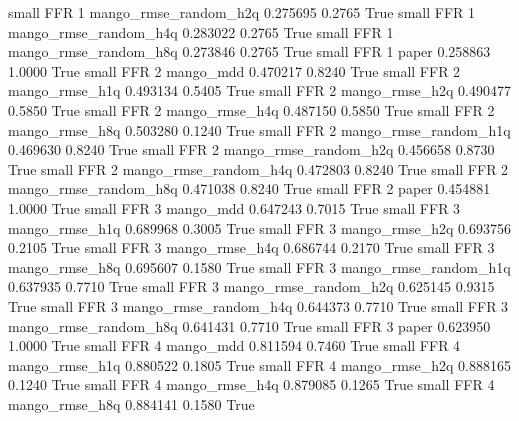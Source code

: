      small      FFR                 1 mango_rmse_random_h2q   0.275695      0.2765    True
     small      FFR                 1 mango_rmse_random_h4q   0.283022      0.2765    True
     small      FFR                 1 mango_rmse_random_h8q   0.273846      0.2765    True
     small      FFR                 1                 paper   0.258863      1.0000    True
     small      FFR                 2             mango_mdd   0.470217      0.8240    True
     small      FFR                 2        mango_rmse_h1q   0.493134      0.5405    True
     small      FFR                 2        mango_rmse_h2q   0.490477      0.5850    True
     small      FFR                 2        mango_rmse_h4q   0.487150      0.5850    True
     small      FFR                 2        mango_rmse_h8q   0.503280      0.1240    True
     small      FFR                 2 mango_rmse_random_h1q   0.469630      0.8240    True
     small      FFR                 2 mango_rmse_random_h2q   0.456658      0.8730    True
     small      FFR                 2 mango_rmse_random_h4q   0.472803      0.8240    True
     small      FFR                 2 mango_rmse_random_h8q   0.471038      0.8240    True
     small      FFR                 2                 paper   0.454881      1.0000    True
     small      FFR                 3             mango_mdd   0.647243      0.7015    True
     small      FFR                 3        mango_rmse_h1q   0.689968      0.3005    True
     small      FFR                 3        mango_rmse_h2q   0.693756      0.2105    True
     small      FFR                 3        mango_rmse_h4q   0.686744      0.2170    True
     small      FFR                 3        mango_rmse_h8q   0.695607      0.1580    True
     small      FFR                 3 mango_rmse_random_h1q   0.637935      0.7710    True
     small      FFR                 3 mango_rmse_random_h2q   0.625145      0.9315    True
     small      FFR                 3 mango_rmse_random_h4q   0.644373      0.7710    True
     small      FFR                 3 mango_rmse_random_h8q   0.641431      0.7710    True
     small      FFR                 3                 paper   0.623950      1.0000    True
     small      FFR                 4             mango_mdd   0.811594      0.7460    True
     small      FFR                 4        mango_rmse_h1q   0.880522      0.1805    True
     small      FFR                 4        mango_rmse_h2q   0.888165      0.1240    True
     small      FFR                 4        mango_rmse_h4q   0.879085      0.1265    True
     small      FFR                 4        mango_rmse_h8q   0.884141      0.1580    True
